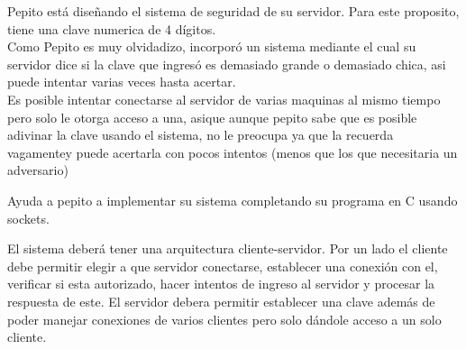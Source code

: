 \documentclass{article}
\begin{document}
Pepito está diseñando el sistema de seguridad de su servidor. Para este
proposito, tiene una clave numerica de 4 dígitos.\\

Como Pepito es muy olvidadizo, incorporó un sistema mediante el cual su
servidor dice si la clave que ingresó es demasiado grande o demasiado chica,
asi puede intentar varias veces hasta acertar.\\

Es posible intentar conectarse al servidor de varias maquinas al mismo tiempo
pero solo le otorga acceso a una, asique aunque pepito sabe que es posible
adivinar la clave usando el sistema, no le preocupa ya que la recuerda 
vagamentey puede acertarla con pocos intentos (menos que los que necesitaria
un adversario)

Ayuda a pepito a implementar su sistema completando su programa en C usando sockets.

El sistema deberá tener una arquitectura cliente-servidor. Por un lado el cliente debe permitir 
elegir a que servidor conectarse, establecer una conexión con el, verificar si esta autorizado,
hacer intentos de ingreso al servidor y procesar la respuesta de este.
El servidor debera permitir establecer una clave además de poder manejar conexiones de varios clientes
pero solo dándole acceso a un solo cliente.
\end{document}
